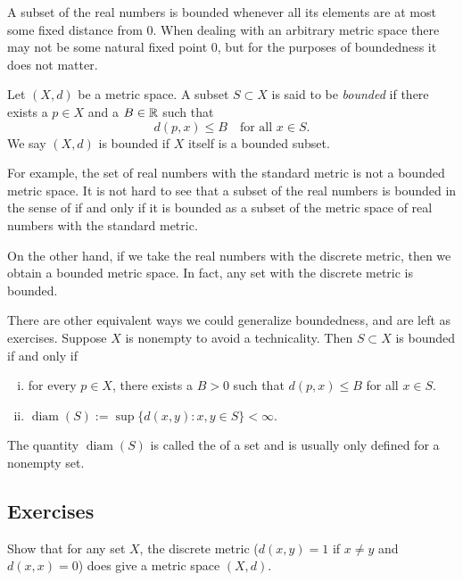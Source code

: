 \medskip

A subset of the real
numbers is bounded whenever all its elements are at most some fixed distance
from 0.
When dealing with an arbitrary metric space there may not be some
natural fixed point 0, but for the purposes of boundedness it does not matter.

\begin{defn}
Let $(X,d)$ be a metric space.  A subset $S \subset X$ is said to be
\emph{bounded} if there exists a $p \in X$ and a
$B \in {\mathbb{R}}$ such that
\begin{equation*}
d(p,x) \leq B \quad \text{for all } x \in S.
\end{equation*}
We say $(X,d)$ is bounded if $X$ itself is a bounded subset.
\end{defn}

For example, the set of real numbers with the standard metric is not a
bounded metric space.  It is not hard to see that a
subset of the real numbers is bounded in the
sense of  if and only if it is bounded as a subset of the
metric space of real numbers with the standard metric.

On the other hand, if we take the real numbers with the discrete metric,
then we obtain a bounded metric space.  In fact, any set with the
discrete metric is bounded.

There are other equivalent ways we could generalize boundedness,
and are left as exercises.  Suppose $X$ is nonempty to avoid a technicality.
Then $S \subset X$ is bounded if and only if
\begin{enumerate}[(i)]
\item
for every $p \in X$, there exists a $B > 0$ such that $d(p,x) \leq B$ for
all $x \in S$.
\item 
{}
$\operatorname{diam}(S) := \sup \{ d(x,y) : x,y \in S \} < \infty$.
\end{enumerate}
The quantity $\operatorname{diam}(S)$ is called the
\emph{} of a set and is usually only defined for
a nonempty set.

\subsection{Exercises}

\begin{exercise}
Show that for any set $X$, the discrete metric ($d(x,y) = 1$ if $x\not=y$ and
$d(x,x) = 0$) does give a metric space $(X,d)$.
\end{exercise}

